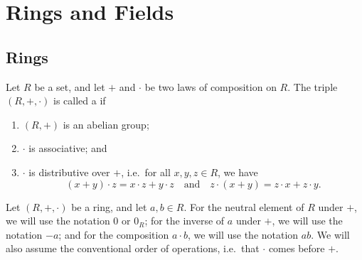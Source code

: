 \chapter{Rings and Fields}

\section{Rings}

\begin{defn}
Let $ R $ be a set, and let $ + $ and $ \cdot $ be two laws of composition on $ R $. The triple $ (R,+,\cdot) $ is called a  if
\begin{enumerate}
    \item $ (R,+) $ is an abelian group;
    \item $ \cdot $ is associative; and
    \item $ \cdot $ is distributive over $ + $, i.e.\ for all $ x,y,z\in R $, we have
    \begin{equation*}
        (x+y)\cdot z=x\cdot z+y\cdot z \quad\text{and}\quad z\cdot(x+y)=z\cdot x+z\cdot y.
    \end{equation*}
\end{enumerate}
\end{defn}

Let $ (R,+,\cdot) $ be a ring, and let $ a,b\in R $. For the neutral element of $ R $ under $ + $, we will use the notation $ 0 $ or $ 0_R $; for the inverse of $ a $ under $ + $, we will use the notation $ -a $; and for the composition $ a\cdot b $, we will use the notation $ ab $. We will also assume the conventional order of operations, i.e.\ that $ \cdot $ comes before $ + $.

